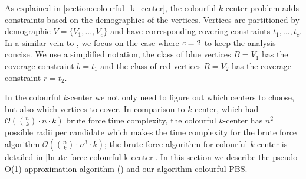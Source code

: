 As explained in \cref{section:colourful_k_center}, the colourful $k$-center problem adds constraints based on the demographics of the vertices. Vertices are partitioned by demographic $V=\{V_1,...,V_c\}$ and have corresponding covering constraints $t_1,...,t_c$. In a similar vein to \textcite{bandyapadhyay_constant_2019}, we focus on the case where $\emph{c}=2$ to keep the analysis concise. We use a simplified notation, the class of blue vertices $B=V_1$ has the coverage constraint $b=t_1$ and the class of red vertices $R=V_2$ has the coverage constraint $r=t_2$. 

In the colourful $k$-center we not only need to figure out which centers to choose, but also which vertices to cover. In comparison to $k$-center, which had $\mathcal{O}(\binom{n}{k}\cdot n\cdot k)$ brute force time complexity, the colourful $k$-center has $n^2$ possible radii per candidate which makes the time complexity for the brute force algorithm $\mathcal{O}(\binom{n}{k}\cdot n^3\cdot k)$; the brute force algorithm for colourful $k$-center is detailed in \cref{brute-force-colourful-k-center}. In this section we describe the pseudo O(1)-approximation algorithm (\cite{bandyapadhyay_constant_2019}) and our algorithm colourful PBS.